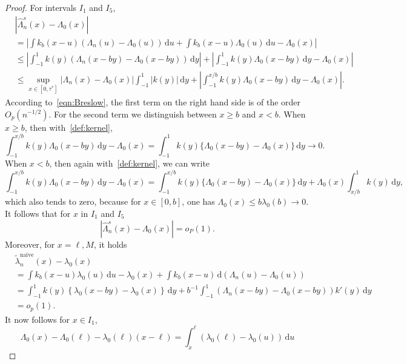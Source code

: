 \documentclass[11pt,reqno]{amsart}
\theoremstyle{definition}
\theoremstyle{plain}
\theoremstyle{remark}
\begin{document}
\begin{proof}
For intervals $I_1$ and $I_5$,
\[
\begin{split}
&
\left|\hat\Lambda_n^s(x)-\Lambda_0(x)\right|\\
&=
\left|\int k_b(x-u)
\left(\Lambda_n(u)-\Lambda_0(u)\right)\,\mathrm{d}u
+
\int k_b(x-u)\Lambda_0(u)\,\mathrm{d}u-\Lambda_0(x)\right|\\
&\leq \left|
\int_{-1}^{1} k(y)
\left(\Lambda_n(x-by)-\Lambda_0(x-by)\right)\,\mathrm{d}y\right|
+
\left|\int_{-1}^{1} k(y)\Lambda_0(x-by)\,\mathrm{d}y-\Lambda_0(x)\right|\\
&\leq
\sup_{x\in[0,\tau^*]}\left|\Lambda_n(x)-\Lambda_0(x)\right|\int_{-1}^1 |k(y)|\,\mathrm{d}y
+
\left|\int_{-1}^{x/b} k(y)\Lambda_0(x-by)\,\mathrm{d}y-\Lambda_0(x)\right|.
\end{split}
\]
According to~\eqref{eqn:Breslow}, the first term on the right hand side is of the order $O_p(n^{-1/2})$.
For the second term we distinguish between $x\geq b$ and $x<b$.
When $x\geq b$, then with~\eqref{def:kernel},
\[
\int_{-1}^{x/b} k(y)\Lambda_0(x-by)\,\mathrm{d}y-\Lambda_0(x)
=
\int_{-1}^1 k(y)
\Big\{
\Lambda_0(x-by)-\Lambda_0(x)
\Big\}\,\mathrm{d}y
\to0.
\]
When $x<b$, then again with~\eqref{def:kernel}, we can write
\[
\int_{-1}^{x/b} k(y)\Lambda_0(x-by)\,\mathrm{d}y-\Lambda_0(x)
=
\int_{-1}^{x/b} k(y)
\Big\{
\Lambda_0(x-by)-\Lambda_0(x)
\Big\}\,\mathrm{d}y
+
\Lambda_0(x)\int_{x/b}^1 k(y)\,\mathrm{d}y,
\]
which also tends to zero, because for $x\in[0,b]$, one has $\Lambda_0(x)\leq b\lambda_0(b)\to 0$.
It follows that for $x$ in $I_1$ and $I_5$
\begin{equation}
\label{eq:Lemma54 GS}
\left|\hat\Lambda_n^s(x)-\Lambda_0(x)\right|=o_P(1).
\end{equation}
Moreover, for $x=\ell,M$, it holds
\begin{equation}
\label{eq:Lemma53 GS}
\begin{split}
&
\tilde{\lambda}_n^{\mathrm{naive}}(x)-\lambda_0(x)\\
&=
\int k_b(x-u)\lambda_0(u)\,\mathrm{d}u-\lambda_0(x)
+
\int k_b(x-u)\,\mathrm{d}\left(\Lambda_n(u)-\Lambda_0(u)\right)\\
&=
\int_{-1}^1 k(y)
\left\{
\lambda_0(x-by)-\lambda_0(x)
\right\}\,\mathrm{d}y
+
b^{-1}
\int_{-1}^1
\left(\Lambda_n(x-by)-\Lambda_0(x-by)\right)
k'(y)\,\mathrm{d}y\\
&=
o_p(1).
\end{split}
\end{equation}
It now follows for $x\in I_1$,
\[
\Lambda_0(x)-\Lambda_0(\ell)
-
\lambda_0(\ell)(x-\ell)
=
\int_x^\ell\left(\lambda_0(\ell)-\lambda_0(u)\right)\,\mathrm{d}u
\]
\end{proof}
\end{document}

